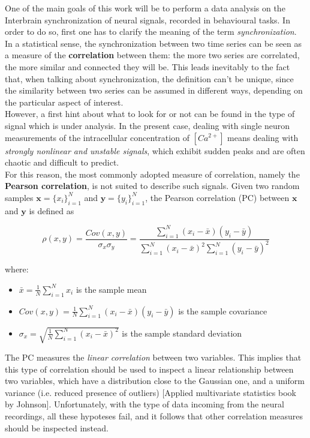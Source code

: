 \documentclass[12pt, a4paper]{article}
\begin{document}
One of the main goals of this work will be to perform a data analysis on the Interbrain synchronization of neural signals, recorded in behavioural tasks. In order to do so, first one has to clarify the meaning of the term  \textit{synchronization}.\\
In a statistical sense, the synchronization between two time series can be seen as a measure of the \textbf{correlation} between them: the more two series are correlated, the more similar and connected they will be. This leads inevitably to the fact that, when talking about synchronization, the definition can't be unique, since the similarity between two series can be assumed in different ways, depending on the particular aspect of interest. \\
However, a first hint about what to look for or not can be found in the type of signal which is under analysis. In the present case, dealing with single neuron measurements of the intracellular concentration of $[Ca^{2+}]$ means dealing with \textit{strongly nonlinear and unstable signals}, which exhibit sudden peaks and are often chaotic and difficult to predict.\\
For this reason, the most commonly adopted measure of correlation, namely the \textbf{Pearson correlation}, is not suited to describe such signals. Given two random samples $ \textbf{x} = \{x_i\}_{i=1}^N$ and  $ \textbf{y} = \{y_i\}_{i=1}^N$, the Pearson correlation (PC) between  $ \textbf{x}$ and  $ \textbf{y}$ is defined as

\begin{equation}
	 \rho(x,y) = \frac{Cov(x,y)}{\sigma_x \sigma_y} = \frac{\sum_{i=1}^{N}(x_i-\bar{x}) (y_i-\bar{y})} {\sum_{i=1}^{N}(x_i-\bar{x})^2 \sum_{i=1}^{N} (y_i-\bar{y})^2} \label{pearson}
\end{equation}


where:
\begin{itemize}
	\item $ \bar{x} = \frac{1}{N}\sum_{i=1}^{N}x_i$ is the sample mean
	
	\item $Cov(x,y) = \frac{1}{N}\sum_{i=1}^{N}(x_i-\bar{x}) (y_i-\bar{y})$ is the sample covariance
	
	\item $\sigma_x = \sqrt{\frac{1}{N}\sum_{i=1}^{N}(x_i-\bar{x})^2}$ is the sample standard deviation
\end{itemize}

The PC measures the \textit{linear correlation} between two variables. This implies that this type of correlation should be used to inspect a linear relationship between two variables, which have a distribution close to the Gaussian one, and a uniform variance (i.e. reduced presence of outliers) [Applied multivariate statistics book by Johnson]. Unfortunately, with the type of data incoming from the neural recordings, all these hypoteses fail, and it follows that other correlation measures should be inspected instead.
\end{document}
